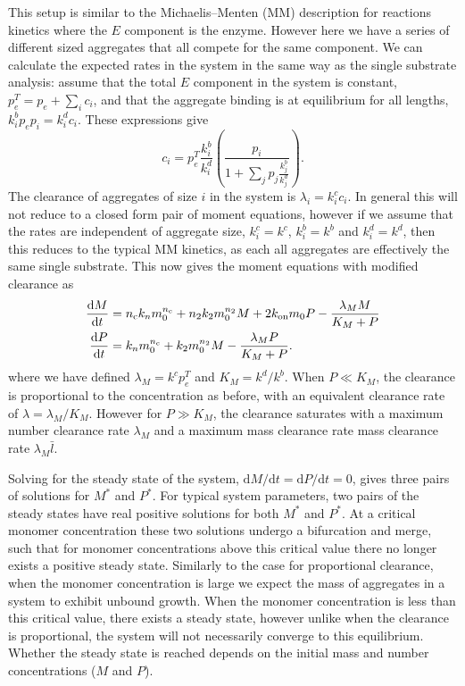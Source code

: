 This setup is similar to the Michaelis–Menten (MM) description for reactions kinetics where the $E$ component is the enzyme. However here we have a series of different sized aggregates that all compete for the same component. We can calculate the expected rates in the system in the same way as the single substrate analysis: assume that the total $E$ component in the system is constant, $p_e^{T} = p_e + \sum_i c_i$, and that the aggregate binding is at equilibrium for all lengths, $k_i^b p_e p_i = k_i^d c_i$. These expressions give
\begin{equation}
    c_i = p_e^{T}\frac{k_i^b}{k_i^d}\left(\frac{p_i}{1+\sum_j p_j \frac{k_j^b}{k_j^d}}\right).
\end{equation}
The clearance of aggregates of size $i$ in the system is $\lambda_i = k_i^{c}c_i$. In general this will not reduce to a closed form pair of moment equations, however if we assume that the rates are independent of aggregate size, $k_i^{c}=k^{c}$, $k_i^{b}=k^{b}$ and $k_i^{d}=k^{d}$, then this reduces to the typical MM kinetics, as each all aggregates are effectively the same single substrate. This now gives the moment equations with modified clearance as
\begin{align}
    \frac{\text{d}M}{\text{d}t}&= n_{\mathrm{c}} k_n m_0^{n_{\mathrm{c}}} + n_2 k_2 m_0^{n_2} M + 2 k_\text{on} m_0 P - \frac{\lambda_M M}{K_M+P} \\
    \frac{\text{d}P}{\text{d}t}&= k_n m_0^{n_{\mathrm{c}}} + k_2 m_0^{n_2} M - \frac{\lambda_{M} P}{K_M+P}.
    \label{eq:4-reducedMM}
\end{align}
where we have defined $\lambda_M = k^{c} p_e^T$ and $K_M = k^d/k^b$. When $P \ll K_M$, the clearance is proportional to the concentration as before, with an equivalent clearance rate of $\lambda = \lambda_M/K_M$. However for $P \gg K_M$, the clearance saturates with a maximum number clearance rate $\lambda_M$ and a maximum mass clearance rate mass clearance rate $\lambda_M\bar{l}$.

Solving for the steady state of the system, $\text{d}M/\text{d}t=\text{d}P/\text{d}t=0$, gives three pairs of solutions for $M^*$ and $P^*$. For typical system parameters, two pairs of the steady states have real positive solutions for both $M^*$ and $P^*$. At a critical monomer concentration these two solutions undergo a bifurcation and merge, such that for monomer concentrations above this critical value there no longer exists a positive steady state. Similarly to the case for proportional clearance, when the monomer concentration is large we expect the mass of aggregates in a system to exhibit unbound growth. When the monomer concentration is less than this critical value, there exists a steady state, however unlike when the clearance is proportional, the system will not necessarily converge to this equilibrium. Whether the steady state is reached depends on the initial mass and number concentrations ($M$ and $P$).

